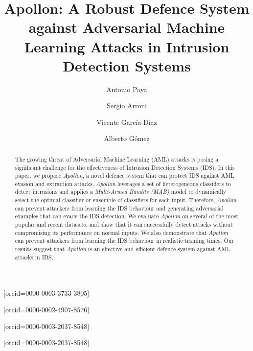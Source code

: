 \documentclass[a4paper,fleqn]{cas-dc}
\begin{document}

    \title [mode = title]{Apollon: A Robust Defence System against Adversarial Machine Learning Attacks in Intrusion Detection Systems}


    \author[uniovi]{Antonio Paya}[orcid=0000-0003-3733-3805]\cormark[1]

    \author[uniovi]{Sergio Arroni}[orcid=0000-0002-4907-8576]

    \author[uniovi]{Vicente García-Díaz}[orcid=0000-0003-2037-8548]

    \author[epi]{Alberto Gómez}[orcid=0000-0003-2037-8548]

    \address[uniovi]{Department of Computer Science,
        University of Oviedo, Science Faculty, Oviedo, Spain}
    \address[epi]{Department of Business Administration, University of Oviedo, Gijón, Spain}

    \begin{abstract}
        The growing threat of Adversarial Machine Learning (AML) attacks is posing a significant
        challenge for the effectiveness of Intrusion Detection Systems (IDS).
        In this paper, we propose \textit{Apollon}, a novel defence system that can protect IDS against
        AML evasion and extraction attacks.
        \textit{Apollon} leverages a set of heterogeneous classifiers to detect intrusions and applies a
        \textit{Multi-Armed Bandits (MAB)} model to dynamically select the optimal classifier or ensemble of classifiers
        for each input.
        Therefore, \textit{Apollon} can prevent attackers from learning the IDS behaviour and generating
        adversarial examples that can evade the IDS detection.
        We evaluate \textit{Apollon} on several of the most popular and recent datasets, and show that it can successfully
        detect attacks without compromising its performance on normal inputs.
        We also demonstrate that \textit{Apollon} can prevent attackers from learning the IDS behaviour in realistic
        training times.
        Our results suggest that \textit{Apollon} is an effective and efficient defence system against AML attacks in IDS.
    \end{abstract}
\end{document}
